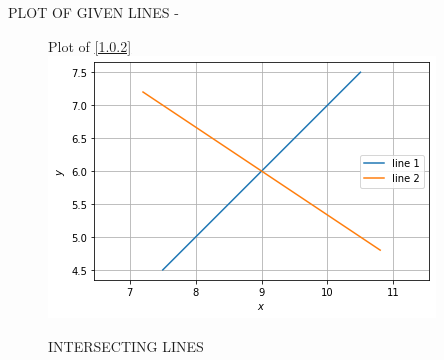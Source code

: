 \documentclass[journal,12pt,twocolumn]{IEEEtran}
\begin{document}
\begin{enumerate}
PLOT OF GIVEN LINES -
\begin{figure}[!ht]
Plot of \eqref{1.0.2} 
    \centering
   \includegraphics[width=\columnwidth]{figure2.png}
    \caption{INTERSECTING LINES}
    \label{fig:INTERSECTING LINES}
\end{figure}    
\end{enumerate}
\end{document}
